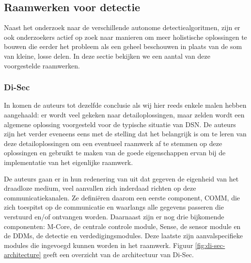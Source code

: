 
\subsection{Raamwerken voor detectie}
\label{subsection:frameworks}

Naast het onderzoek naar de verschillende autonome detectiealgoritmen, zijn er
ook onderzoekers actief op zoek naar manieren om meer holistische oplossingen
te bouwen die eerder het probleem als een geheel beschouwen in plaats van de
som van kleine, losse delen. In deze sectie bekijken we een aantal van deze
voorgestelde raamwerken.

\subsubsection*{Di-Sec}
\label{subsubsection:di-sec}

In \cite{valero2012di} komen de auteurs tot dezelfde conclusie als wij hier
reeds enkele malen hebben aangehaald: er wordt veel gekeken naar
detailoplossingen, maar zelden wordt een algemene oplossing voorgesteld voor de
typische situatie van DSN. De auteurs zijn het verder eveneens eens met de
stelling dat het belangrijk is om te leren van deze detailoplossingen om een
eventueel raamwerk af te stemmen op deze oplossingen en gebruikt te maken van
de goede eigenschappen ervan bij de implementatie van het eigenlijke raamwerk.

De auteurs gaan er in hun redenering van uit dat gegeven de eigenheid van het
draadloze medium, veel aanvallen zich inderdaad richten op deze
communicatiekanalen. Ze defini\"eren daarom een eerste component, COMM, die
zich toespitst op de communicatie en waarlangs alle gegevens passeren die
verstuurd en/of ontvangen worden. Daarnaast zijn er nog drie bijkomende
componenten: M-Core, de centrale controle module, Sense, de sensor module en de
DDMs, de detectie en verdedigingsmodules. Deze laatste zijn aanvalspecifieke
modules die ingevoegd kunnen worden in het raamwerk. Figuur
\ref{fig:di-sec-architecture} geeft een overzicht van de architectuur van
Di-Sec.

